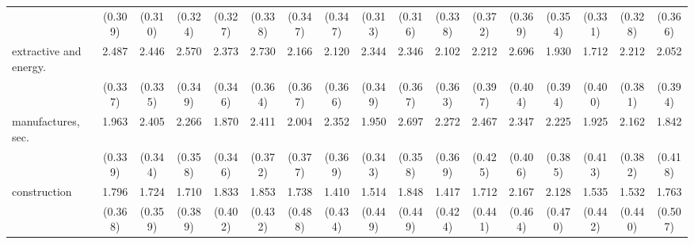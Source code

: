 {\begin{tabular}{l*{16}{c}}
                    &     (0.309)         &     (0.310)         &     (0.324)         &     (0.327)         &     (0.338)         &     (0.347)         &     (0.347)         &     (0.313)         &     (0.316)         &     (0.338)         &     (0.372)         &     (0.369)         &     (0.354)         &     (0.331)         &     (0.328)         &     (0.366)         \\
[1em]
extractive and energy.&       2.487\sym{***}&       2.446\sym{***}&       2.570\sym{***}&       2.373\sym{***}&       2.730\sym{***}&       2.166\sym{***}&       2.120\sym{***}&       2.344\sym{***}&       2.346\sym{***}&       2.102\sym{***}&       2.212\sym{***}&       2.696\sym{***}&       1.930\sym{***}&       1.712\sym{***}&       2.212\sym{***}&       2.052\sym{***}\\
                    &     (0.337)         &     (0.335)         &     (0.349)         &     (0.346)         &     (0.364)         &     (0.367)         &     (0.366)         &     (0.349)         &     (0.367)         &     (0.363)         &     (0.397)         &     (0.404)         &     (0.394)         &     (0.400)         &     (0.381)         &     (0.394)         \\
[1em]
manufactures, sec.  &       1.963\sym{***}&       2.405\sym{***}&       2.266\sym{***}&       1.870\sym{***}&       2.411\sym{***}&       2.004\sym{***}&       2.352\sym{***}&       1.950\sym{***}&       2.697\sym{***}&       2.272\sym{***}&       2.467\sym{***}&       2.347\sym{***}&       2.225\sym{***}&       1.925\sym{***}&       2.162\sym{***}&       1.842\sym{***}\\
                    &     (0.339)         &     (0.344)         &     (0.358)         &     (0.346)         &     (0.372)         &     (0.377)         &     (0.369)         &     (0.343)         &     (0.358)         &     (0.369)         &     (0.425)         &     (0.406)         &     (0.385)         &     (0.413)         &     (0.382)         &     (0.418)         \\
[1em]
construction        &       1.796\sym{***}&       1.724\sym{***}&       1.710\sym{***}&       1.833\sym{***}&       1.853\sym{***}&       1.738\sym{***}&       1.410\sym{**} &       1.514\sym{***}&       1.848\sym{***}&       1.417\sym{***}&       1.712\sym{***}&       2.167\sym{***}&       2.128\sym{***}&       1.535\sym{***}&       1.532\sym{***}&       1.763\sym{***}\\
                    &     (0.368)         &     (0.359)         &     (0.389)         &     (0.402)         &     (0.432)         &     (0.488)         &     (0.434)         &     (0.449)         &     (0.449)         &     (0.424)         &     (0.441)         &     (0.464)         &     (0.470)         &     (0.442)         &     (0.440)         &     (0.507)         \\

\end{tabular}}
